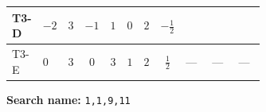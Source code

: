 \documentclass[8pt]{article}
\begin{document}
\begin{landscape}
\begin{longtable}{@{}llcccccc >{\raggedright\arraybackslash}p{0.21\linewidth} >{\raggedright\arraybackslash}p{0.21\linewidth} >{\raggedright\arraybackslash}p{0.21\linewidth}@{}}
T3-D & $-2$ & $3$ & $-1$ & $1$ & $0$ & $2$ & $-\frac{1}{2}$ & \scriptsize\adjustbox{max width=\linewidth}{$\begin{gathered} - \frac{11 \cdot 3^{\frac{3}{4}} i g_{2}^{2} \overline{y_{1}} \overline{y_{2}}}{8 MF}\end{gathered}$} & \scriptsize\adjustbox{max width=\linewidth}{$\begin{gathered} - \frac{3^{\frac{3}{4}} i lambda12Inv1 \overline{y_{1}} \overline{y_{2}}}{6 MF}\end{gathered}$} & \scriptsize\adjustbox{max width=\linewidth}{$\begin{gathered} - \frac{3^{\frac{3}{4}} i g_{1}^{2} \overline{y_{1}} \overline{y_{2}}}{8 MF}\end{gathered}$} \\
\midrule
T3-E & $0$ & $3$ & $0$ & $3$ & $1$ & $2$ & $\frac{1}{2}$ & --- & --- & --- \\
\midrule
\bottomrule
\end{longtable}
\clearpage
\noindent\textbf{Search name: }\texttt{1,1,9,11}\par\smallskip

\end{landscape}
\end{document}
